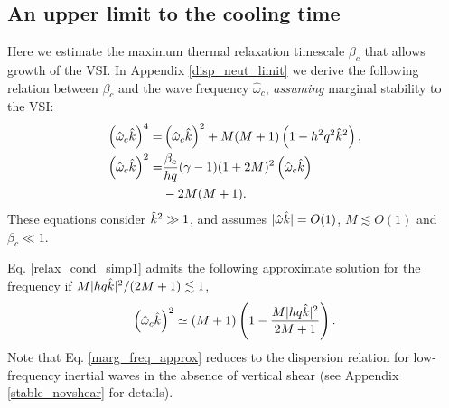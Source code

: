 \subsection{An upper limit to the cooling time}\label{iso_vsi_beta_crit}
Here we estimate the maximum thermal relaxation timescale 
$\beta_c$ that allows growth of the VSI. In Appendix \ref{disp_neut_limit}
we derive the following relation between $\beta_c$ and the wave
frequency $\hat{\omega}_c$, \emph{assuming} marginal stability to the
VSI:  
\begin{subequations}\begin{align}
    \left(\hat{\omega}_c\hat{k}\right)^4  =& \left(\hat{\omega}_c\hat{k}\right)^2 
  + M(M+1)\left(1-h^2q^2\hat{k}^2\right) ,\label{relax_cond_simp1}  \\
  \left(\hat{\omega}_c\hat{k}\right)^2 = & \frac{\beta_c}{h q} (\gamma-1)(1+2M)^2
  \left(\hat{\omega}_c\hat{k}\right) \label{relax_cond_simp2}\\
  &- 2M(M+1) . \notag
\end{align}\end{subequations}
These equations consider $\hat{k}^2\gg 1$, and assumes 
$|\hat{\omega}\hat{k}| = O(1)$, $M\lesssim O(1)$ and $\beta_c\ll 1$.   
     
Eq. \ref{relax_cond_simp1} admits the following   
approximate solution for the frequency if $M|hq\hat{k}|^2/(2M+1)\lesssim
1$, 
\begin{align}
  \left(\hat{\omega}_c\hat{k}\right)^2 \simeq (M+1)\left(1 -
    \frac{M|h q \hat{k}|^2}{2M+1}\right).  \label{marg_freq_approx}
\end{align}  
Note that Eq. \ref{marg_freq_approx} reduces to the dispersion
relation for low-frequency inertial waves in the absence of vertical
shear (see Appendix \ref{stable_novshear} for details). 


